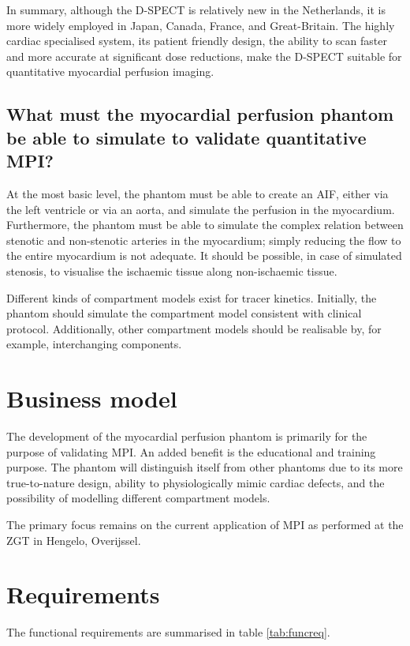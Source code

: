 In summary, although the D-SPECT is relatively new in the Netherlands, it is more widely employed in Japan, Canada, France, and Great-Britain. The highly cardiac specialised system, its patient friendly design, the ability to scan faster and more accurate at significant dose reductions, make the D-SPECT suitable for quantitative myocardial perfusion imaging. 

\subsection{What must the myocardial perfusion phantom be able to simulate to validate quantitative MPI?}
At the most basic level, the phantom must be able to create an \ac{AIF}, either via the left ventricle or via an aorta, and simulate the perfusion in the myocardium. Furthermore, the phantom must be able to simulate the complex relation between stenotic and non-stenotic arteries in the myocardium; simply reducing the flow to the entire myocardium is not adequate. It should be possible, in case of simulated stenosis, to visualise the ischaemic tissue along non-ischaemic tissue.

Different kinds of compartment models exist for tracer kinetics. Initially, the phantom should simulate the compartment model consistent with clinical protocol. Additionally, other compartment models should be realisable by, for example, interchanging components.

\section{Business model}
The development of the myocardial perfusion phantom is primarily for the purpose of validating \ac{MPI}. An added benefit is the educational and training purpose. The phantom will distinguish itself from other phantoms due to its more true-to-nature design, ability to physiologically mimic cardiac defects, and the possibility of modelling different compartment models.

The primary focus remains on the current application of \ac{MPI} as performed at the ZGT in Hengelo, Overijssel.

\section{Requirements}
The functional requirements are summarised in table \ref{tab:funcreq}.

